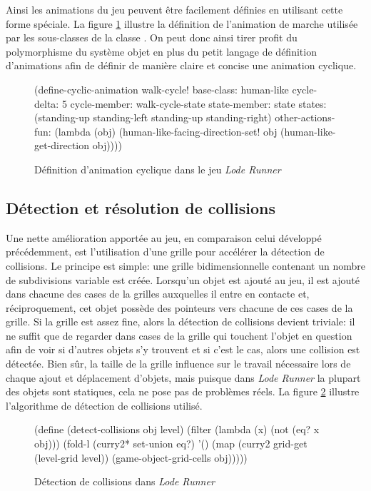 \documentclass[12pt,oneside,letterpaper,francais]{book}
\newcommand{\lr}{{\textit{Lode Runner }}}
\newcommand{\scheme}[1]{\selectlanguage{english}{\tt #1}\selectlanguage{french}}
\begin{document}
Ainsi les animations du jeu peuvent être facilement définies en
utilisant cette forme spéciale. La figure \ref{Exp:cyclic-anim-def}
illustre la définition de l'animation de marche utilisée par les
sous-classes de la classe \scheme{human-like}. On peut donc ainsi
tirer profit du polymorphisme du système objet en plus du petit
langage de définition d'animations afin de définir de manière claire
et concise une animation cyclique.

\begin{figure}[htb!]
  \begin{schemecode}
(define-cyclic-animation walk-cycle!
  base-class: human-like
  cycle-delta: 5
  cycle-member: walk-cycle-state state-member: state
  states: (standing-up standing-left standing-up standing-right)
  other-actions-fun:
    (lambda (obj) (human-like-facing-direction-set!
                   obj (human-like-get-direction obj))))
  \end{schemecode}
  \caption{Définition d'animation cyclique dans le jeu \lr}
  \label{Exp:cyclic-anim-def}
\end{figure}

\subsection{Détection et résolution de collisions}

Une nette amélioration apportée au jeu, en comparaison celui
développé précédemment, est l'utilisation d'une grille pour accélérer
la détection de collisions. Le principe est simple: une grille
bidimensionnelle contenant un nombre de subdivisions variable est
créée. Lorsqu'un objet est ajouté au jeu, il est ajouté dans chacune
des cases de la grilles auxquelles il entre en contacte et,
réciproquement, cet objet possède des pointeurs vers chacune de ces
cases de la grille. Si la grille est assez fine, alors la détection de
collisions devient triviale: il ne suffit que de regarder dans cases
de la grille qui touchent l'objet en question afin de voir si d'autres
objets s'y trouvent et si c'est le cas, alors une collision est
détectée. Bien sûr, la taille de la grille influence sur le travail
nécessaire lors de chaque ajout et déplacement d'objets, mais puisque
dans \lr la plupart des objets sont statiques, cela ne pose pas de
problèmes réels. La figure \ref{Exp:lr-col-detection} illustre
l'algorithme de détection de collisions utilisé.

\begin{figure}[htb!]
  \begin{schemecode}
(define (detect-collisions obj level)
  (filter (lambda (x) (not (eq? x obj)))
          (fold-l (curry2* set-union eq?)
                  '()
                  (map (curry2 grid-get (level-grid level))
                       (game-object-grid-cells obj)))))
  \end{schemecode}
  \caption{Détection de collisions dans \lr}
  \label{Exp:lr-col-detection}
\end{figure}
\end{document}
